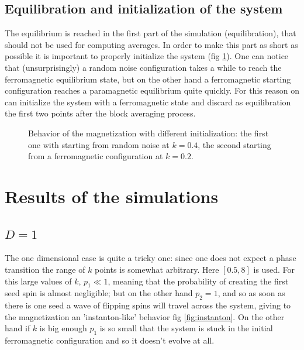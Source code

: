 \documentclass[a4paper, 11pt]{article}
\begin{document}
    \subsection{Equilibration and initialization of the system}
      The equilibrium is reached in the first part of the simulation (equilibration), that should not be used for computing averages. In order to make this part as short as possible it is important to properly initialize the system (fig \ref{fig:equilibration}). One can notice that (unsurprisingly) a random noise configuration takes a while to reach the ferromagnetic equilibrium state, but on the other hand a ferromagnetic starting configuration reaches a paramagnetic equilibrium quite quickly.
      For this reason on can initialize the system with a ferromagnetic state and discard as equilibration the first two points after the block averaging process.

      \begin{figure}[H]
        \centering
         \quad
        \caption{Behavior of the magnetization with different initialization: the first one with starting from random noise at $k = 0.4$, the second starting from a ferromagnetic configuration at $k = 0.2$.}
        \label{fig:equilibration}
      \end{figure}



  \section{Results of the simulations}
    \subsection{$D = 1$}
      The one dimensional case is quite a tricky one: since one does not expect a phase transition the range of $k$ points is somewhat arbitrary. Here $[0.5,8]$ is used. For this large values of $k$, $p_1 \ll 1$, meaning that the probability of creating the first seed spin is almost negligible; but on the other hand $p_2 = 1$, and so as soon as there is one seed a wave of flipping spins will travel across the system, giving to the magnetization an 'instanton-like' behavior fig \ref{fig:instanton}. On the other hand if $k$ is big enough $p_1$ is so small that the system is stuck in the initial ferromagnetic configuration and so it doesn't evolve at all.
\end{document}
